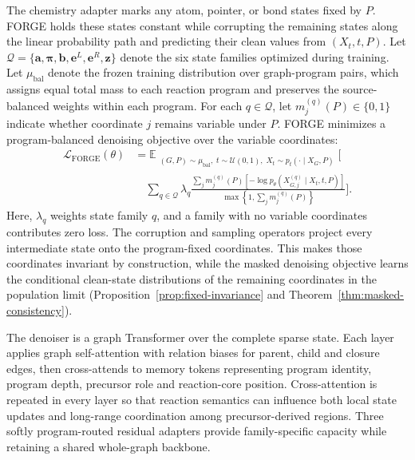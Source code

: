 \documentclass{article}
\begin{document}
The chemistry adapter marks any atom, pointer, or bond states fixed by $P$.
FORGE holds these states constant while corrupting the remaining states along the linear probability
path and predicting their clean values from $(X_t,t,P)$.
Let $\mathcal{Q}=\{\mathbf{a},\boldsymbol{\pi},\mathbf{b},\mathbf{e}^{L},\mathbf{e}^{R},\mathbf{z}\}$
denote the six state families optimized during training.
Let $\mu_{\mathrm{bal}}$ denote the frozen training distribution over graph-program pairs, which
assigns equal total mass to each reaction program and preserves the source-balanced weights within
each program.
For each $q\in\mathcal{Q}$, let $m_j^{(q)}(P)\in\{0,1\}$ indicate whether coordinate $j$ remains
variable under $P$.
FORGE minimizes a program-balanced denoising objective over the variable coordinates:
\begin{equation}
\begin{aligned}
    \mathcal{L}_{\mathrm{FORGE}}(\theta)
    & = \mathbb{E}_{\substack{
        (G,P)\sim\mu_{\mathrm{bal}},\;
        t\sim\mathcal{U}(0,1),\;
        X_t\sim p_t(\cdot\mid X_G,P)
    }}
    \Bigg[
    \\
    & \quad
        \sum_{q\in\mathcal{Q}}
        \lambda_q
        \frac{
            \sum_j m_j^{(q)}(P)
            \left[-\log p_\theta\!\left(X_{G,j}^{(q)}\mid X_t,t,P\right)\right]
        }{
            \max\!\left\{1,\sum_j m_j^{(q)}(P)\right\}
        }
    \Bigg].
\end{aligned}
\end{equation}
Here, $\lambda_q$ weights state family $q$, and a family with no variable coordinates contributes
zero loss.
The corruption and sampling operators project every intermediate state onto the program-fixed
coordinates.
This makes those coordinates invariant by construction, while the masked denoising objective learns
the conditional clean-state distributions of the remaining coordinates in the population limit
(Proposition~\ref{prop:fixed-invariance} and Theorem~\ref{thm:masked-consistency}).

The denoiser is a graph Transformer over the complete sparse state. Each layer applies graph
self-attention with relation biases for parent, child and closure edges, then cross-attends to memory
tokens representing program identity, program depth, precursor role and reaction-core position.
Cross-attention is repeated in every layer so that reaction semantics can influence both local state
updates and long-range coordination among precursor-derived regions. Three softly program-routed
residual adapters provide family-specific capacity while retaining a shared whole-graph backbone.
\end{document}
